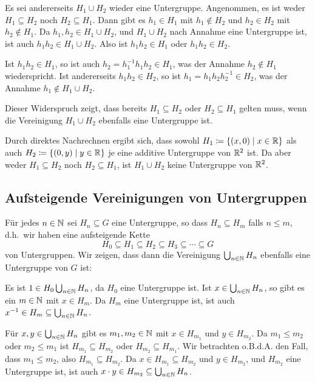 Es sei andererseits $H_1 \cup H_2$ wieder eine Untergruppe. Angenommen, es ist weder $H_1 \subseteq H_2$ noch $H_2 \subseteq H_1$. Dann gibt es $h_1 \in H_1$ mit $h_1 \notin H_2$ und $h_2 \in H_2$ mit $h_2 \notin H_1$. Da $h_1, h_2 \in H_1 \cup H_2$, und $H_1 \cup H_2$ nach Annahme eine Untergruppe ist, ist auch $h_1 h_2 \in H_1 \cup H_2$. Also ist $h_1 h_2 \in H_1$ oder $h_1 h_2 \in H_2$.

Ist $h_1 h_2 \in H_1$, so ist auch $h_2 = h_1^{-1} h_1 h_2 \in H_1$, was der Annahme $h_2 \notin H_1$ wiederspricht. Ist andererseits $h_1 h_2 \in H_2$, so ist $h_1 = h_1 h_2 h_2^{-1} \in H_2$, was der Annahme $h_1 \notin H_1 \cup H_2$.

Dieser Widerspruch zeigt, dass bereits $H_1 \subseteq H_2$ oder $H_2 \subseteq H_1$ gelten muss, wenn die Vereinigung $H_1 \cup H_2$ ebenfalls eine Untergruppe ist.

\begin{bsp}
 Durch direktes Nachrechnen ergibt sich, dass sowohl $H_1 \coloneqq \{(x, 0) \mid x \in \mathbb{R}\}$ als auch $H_2 \coloneqq \{(0,y) \mid y \in \mathbb{R}\}$ je eine additive Untergruppe von $\mathbb{R}^2$ ist. Da aber weder $H_1 \subseteq H_2$ noch $H_2 \subseteq H_1$, ist $H_1 \cup H_2$ keine Untergruppe von $\mathbb{R}^2$.
\end{bsp}


\subsection{Aufsteigende Vereinigungen von Untergruppen}
Für jedes $n \in \mathbb{N}$ sei $H_n \subseteq G$ eine Untergruppe, so dass $H_n \subseteq H_m$ falls $n \leq m$, d.h.\ wir haben eine aufsteigende Kette
\[
 H_0 \subseteq H_1 \subseteq H_2 \subseteq H_3 \subseteq \dotsb \subseteq G
\]
von Untergruppen. Wir zeigen, dass dann die Vereinigung $\bigcup_{n \in \mathbb{N}} H_n$ ebenfalls eine Untergruppe von $G$ ist:

Es ist $1 \in H_0 \bigcup_{n \in \mathbb{N}} H_n$, da $H_0$ eine Untergruppe ist. Ist $x \in \bigcup_{n \in \mathbb{N}} H_n$, so gibt es ein $m \in \mathbb{N}$ mit $x \in H_m$. Da $H_m$ eine Untergruppe ist, ist auch $x^{-1} \in H_m \subseteq \bigcup_{n \in \mathbb{N}} H_n$.

Für $x,y \in \bigcup_{n \in \mathbb{N}} H_n$ gibt es $m_1, m_2 \in \mathbb{N}$ mit $x \in H_{m_1}$ und $y \in H_{m_2}$. Da $m_1 \leq m_2$ oder $m_2 \leq m_1$ ist $H_{m_1} \subseteq H_{m_2}$ oder $H_{m_2} \subseteq H_{m_1}$. Wir betrachten o.B.d.A. den Fall, dass $m_1 \leq m_2$, also $H_{m_1} \subseteq H_{m_2}$. Da $x \in H_{m_1} \subseteq H_{m_2}$ und $y \in H_{m_2}$, und $H_{m_2}$ eine Untergruppe ist, ist auch $x \cdot y \in H_{m_2} \subseteq \bigcup_{n \in \mathbb{N}} H_n$.

